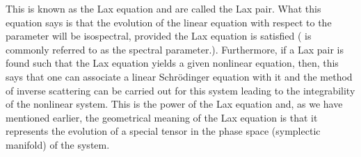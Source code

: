\documentclass[a4paper,11pt]{article}
\begin{document}
This is known as the Lax equation and \coordHE{} are called the Lax
pair. What this equation says is that the evolution of the linear
equation with respect to the parameter \coordHE{} will be isospectral,
provided the Lax equation is satisfied (\myHighlight{$\lambda$}\coordHE{} is commonly referred
to as the spectral parameter.). Furthermore, if a Lax pair is
found such that the Lax equation yields a given nonlinear equation,
then, this says that one can associate a linear Schr\"{o}dinger
equation with it and the method of inverse scattering can be carried
out for this system leading to the integrability of the nonlinear
system. This is the power of the Lax equation and, as we have
mentioned earlier, the geometrical meaning of the Lax equation is that
it represents the evolution of a special \coordHE{} tensor in the
phase space (symplectic manifold) of the system.
\end{document}
